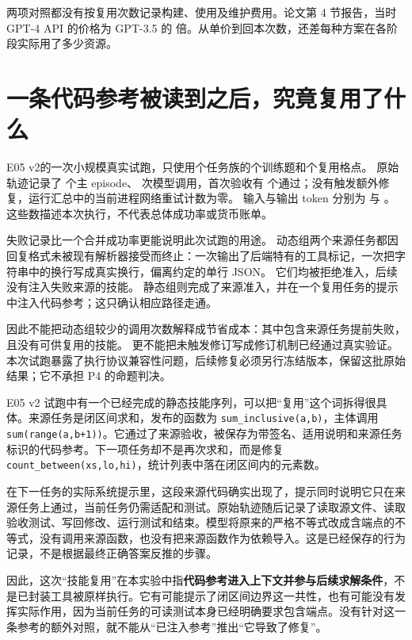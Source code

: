 两项对照都没有按复用次数记录构建、使用及维护费用。论文第 4 节报告，当时 GPT-4 API 的价格为 GPT-3.5 的  倍\cite{voyager-2305}。从单价到回本次数，还差每种方案在各阶段实际用了多少资源。

\section{一条代码参考被读到之后，究竟复用了什么}
\label{sec:ch08-real-reuse}

E05 v2的一次小规模真实试跑，只使用个任务族的个训练题和个复用格点。
原始轨迹记录了  个主 episode、 次模型调用，首次验收有  个通过；没有触发额外修复，运行汇总中的当前进程网络重试计数为零。
输入与输出 token 分别为  与 。这些数描述本次执行，不代表总体成功率或货币账单。

失败记录比一个合并成功率更能说明此次试跑的用途。
动态组两个来源任务都因回复格式未被现有解析器接受而终止：一次输出了后端特有的工具标记，一次把字符串中的换行写成真实换行，偏离约定的单行 JSON。
它们均被拒绝准入，后续没有注入失败来源的技能。
静态组则完成了来源准入，并在一个复用任务的提示中注入代码参考；这只确认相应路径走通。

因此不能把动态组较少的调用次数解释成节省成本：其中包含来源任务提前失败，且没有可供复用的技能。
更不能把未触发修订写成修订机制已经通过真实验证。
本次试跑暴露了执行协议兼容性问题，后续修复必须另行冻结版本，保留这批原始结果；它不承担 P4 的命题判决。


E05 v2 试跑中有一个已经完成的静态技能序列，可以把“复用”这个词拆得很具体。来源任务是闭区间求和，发布的函数为 \texttt{sum\_inclusive(a,b)}，主体调用 \texttt{sum(range(a,b+1))}。它通过了来源验收，被保存为带签名、适用说明和来源任务标识的代码参考。下一项任务却不是再次求和，而是修复 \texttt{count\_between(xs,lo,hi)}，统计列表中落在闭区间内的元素数。

在下一任务的实际系统提示里，这段来源代码确实出现了，提示同时说明它只在来源任务上通过，当前任务仍需适配和测试。原始轨迹随后记录了读取源文件、读取验收测试、写回修改、运行测试和结束。模型将原来的严格不等式改成含端点的不等式，没有调用来源函数，也没有把来源函数作为依赖导入。这是已经保存的行为记录，不是根据最终正确答案反推的步骤。

因此，这次“技能复用”在本实验中指\textbf{代码参考进入上下文并参与后续求解条件}，不是已封装工具被原样执行。它有可能提示了闭区间边界这一共性，也有可能没有发挥实际作用，因为当前任务的可读测试本身已经明确要求包含端点。没有针对这一条参考的额外对照，就不能从“已注入参考”推出“它导致了修复”。

